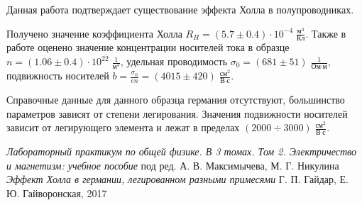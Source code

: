 \documentclass[12pt,a4paper]{article}
\begin{document}
	Данная работа подтверждает существование эффекта Холла в полупроводниках.
	
	Получено значение коэффициента Холла $ R_H = (5.7 \pm 0.4) \cdot 10^{-4} \; \frac{\text{м}^3}{\text{Кл}} $. Также в работе оценено значение концентрации носителей тока в образце $ n = (1.06 \pm 0.4) \cdot 10^{22} \; \frac{1}{\text{м}^3} $, удельная проводимость $ \sigma_0 = (681 \pm 51) \; \frac{1}{\text{Ом} \cdot \text{м}} $, подвижность носителей $ b = \frac{\sigma_0}{e n} = (4015 \pm 420) \; \frac{\text{см}^2}{\text{В} \cdot \text{с}} $.
	
	Справочные данные для данного образца германия отсутствуют, большинство параметров зависят от степени легирования. Значения подвижности носителей зависит от легирующего элемента и лежат в пределах $(2000 \div 3000) \; \frac{\text{см}^2}{\text{В} \cdot \text{с}}$.
	

	
\begin{thebibliography}{9}
	 \emph{Лабораторный практикум по общей физике. В 3 томах. Том 2. Электричество и магнетизм: учебное пособие} под ред. А. В. Максимычева, М. Г. Никулина
	 \emph{Эффект Холла в германии, легированном разными примесями} Г. П. Гайдар, Е. Ю. Гайворонская, 2017
\end{thebibliography}
\end{document}
